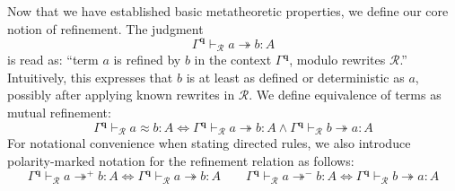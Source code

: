 \documentclass[acmsmall,screen,review]{acmart}
\newcommand{\mc}[1]{\ensuremath{\mathcal{#1}}}
\newcommand{\mb}[1]{\ensuremath{\mathbf{#1}}}
\newcommand{\teqv}{\approx}
\newcommand{\tref}{\twoheadrightarrow}
\newcommand{\tmle}[5]{#1 \vdash_{#2} #3 \tref #4 : {#5}}
\newcommand{\tmlep}[6]{#1 \vdash_{#2} #3 \tref^{#6} #4 : {#5}}
\newcommand{\tmeq}[5]{#1 \vdash_{#2} #3 \teqv #4 : {#5}}
\begin{document}
Now that we have established basic metatheoretic properties, we define our core notion of
refinement. The judgment
\begin{equation*}
  \tmle{\Gamma^{\mb{q}}}{\mc{R}}{a}{b}{A}
\end{equation*}
is read as: ``term $a$ is refined by $b$ in the context $\Gamma^{\mb{q}}$, modulo rewrites
$\mc{R}$.'' Intuitively, this expresses that $b$ is at least as defined or deterministic as $a$,
possibly after applying known rewrites in $\mc{R}$. We define equivalence of terms as mutual
refinement:
\begin{equation}
  \tmeq{\Gamma^{\mb{q}}}{\mc{R}}{a}{b}{A}
  \iff \tmle{\Gamma^{\mb{q}}}{\mc{R}}{a}{b}{A} 
  \land \tmle{\Gamma^{\mb{q}}}{\mc{R}}{b}{a}{A}
\end{equation}
For notational convenience when stating directed rules, we also introduce polarity-marked notation
for the refinement relation as follows:
\begin{equation*}
  \tmlep{\Gamma^{\mb{q}}}{\mc{R}}{a}{b}{A}{+} \iff \tmle{\Gamma^{\mb{q}}}{\mc{R}}{a}{b}{A} \qquad
  \tmlep{\Gamma^{\mb{q}}}{\mc{R}}{a}{b}{A}{-} \iff \tmle{\Gamma^{\mb{q}}}{\mc{R}}{b}{a}{A}
\end{equation*}
\end{document}
